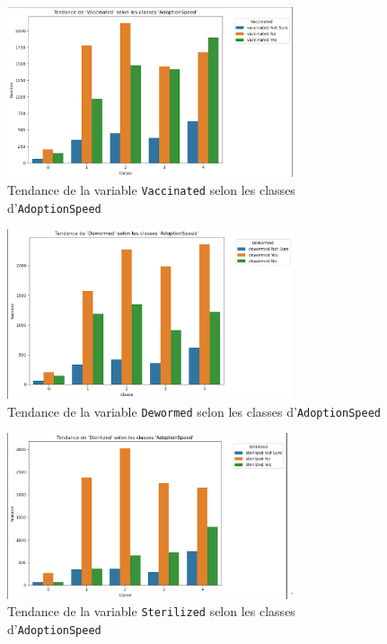 \documentclass[a4paper,12pt]{article}
\begin{document}
\begin{figure}[H]
    \centering
    \includegraphics[width=0.75\textwidth]{vaccinated_adoption_trend.png}
    \caption{Tendance de la variable \texttt{Vaccinated} selon les classes d'\texttt{AdoptionSpeed}}
    \label{fig:vaccinated_trend}
\end{figure}

\begin{figure}[H]
    \centering
    \includegraphics[width=0.75\textwidth]{dewormed_adoption_trend.png}
    \caption{Tendance de la variable \texttt{Dewormed} selon les classes d'\texttt{AdoptionSpeed}}
    \label{fig:dewormed_trend}
\end{figure}

\begin{figure}[H]
    \centering
    \includegraphics[width=0.75\textwidth]{sterilized_adoption_trend.png}
    \caption{Tendance de la variable \texttt{Sterilized} selon les classes d'\texttt{AdoptionSpeed}}
    \label{fig:sterilized_trend_1}
\end{figure}
\end{document}
